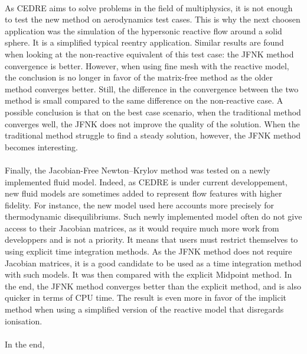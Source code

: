     \paragraph{}
    As CEDRE aims to solve problems in the field of multiphysics, it is not enough to test the new method on aerodynamics test cases.
    This is why the next choosen application was the simulation of the hypersonic reactive flow around a solid sphere.
    It is a simplified typical reentry application.
    Similar results are found when looking at the non-reactive equivalent of this test case: the JFNK method convergence is better.
    However, when using fine mesh with the reactive model, the conclusion is no longer in favor of the matrix-free method as the older method converges better.
    Still, the difference in the convergence between the two method is small compared to the same difference on the non-reactive case.
    A possible conclusion is that on the best case scenario, when the traditional method converges well, the JFNK does not improve the quality of the solution.
    When the traditional method struggle to find a steady solution, however, the JFNK method becomes interesting.

    \paragraph{}
    Finally, the Jacobian-Free Newton--Krylov method was tested on a newly implemented fluid model.
    Indeed, as CEDRE is under current developpement, new fluid models are sometimes added to represent flow features with higher fidelity.
    For instance, the new model used here accounts more precisely for thermodynamic disequilibriums.
    Such newly implemented model often do not give access to their Jacobian matrices, as it would require much more work from developpers and is not a priority.
    It means that users must restrict themselves to using explicit time integration methods.
    As the JFNK method does not require Jacobian matrices, it is a good candidate to be used as a time integration method with such models.
    It was then compared with the explicit Midpoint method.
    In the end, the JFNK method converges better than the explicit method, and is also quicker in terms of CPU time.
    The result is even more in favor of the implicit method when using a simplified version of the reactive model that disregards ionisation.
    

  \paragraph{}
  In the end,
